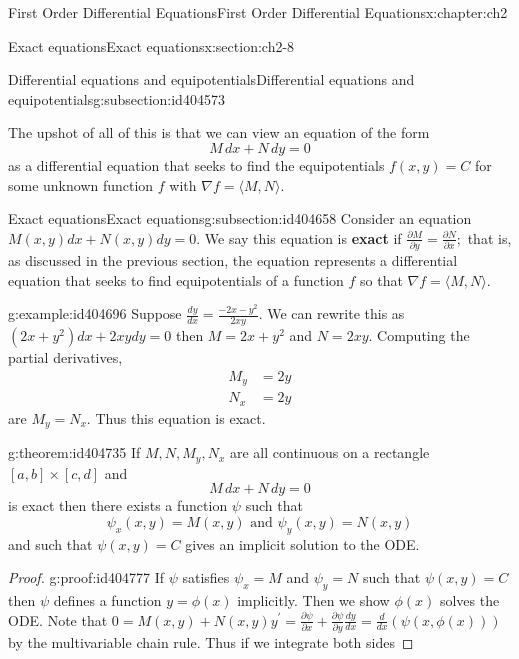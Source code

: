 \documentclass[oneside,10pt,]{book}
\newcommand{\terminology}[1]{\textbf{#1}}
\numberwithin{equation}{section}
\numberwithin{equation}{section}
\newcommand{\amp}{&}
\begin{document}
\begin{chapterptx}{First Order Differential Equations}{}{First Order Differential Equations}{}{}{x:chapter:ch2}
\begin{sectionptx}{Exact equations}{}{Exact equations}{}{}{x:section:ch2-8}
\begin{subsectionptx}{Differential equations and equipotentials}{}{Differential equations and equipotentials}{}{}{g:subsection:id404573}
%
\par
The upshot of all of this is that we can view an equation of the form%
\begin{equation*}
M \, dx + N \, dy = 0
\end{equation*}
as a differential equation that seeks to find the equipotentials \(f(x,y) = C\) for some unknown function \(f\) with \(\nabla f = \langle M, N \rangle\).%
\end{subsectionptx}
%
%
\typeout{************************************************}
\typeout{************************************************}
%
\begin{subsectionptx}{Exact equations}{}{Exact equations}{}{}{g:subsection:id404658}
Consider an equation \(M(x,y)dx+N(x,y)dy=0.\) We say this equation is \terminology{exact} if \(\frac{\partial M}{\partial y}=\frac{\partial N}{\partial x};\) that is, as discussed in the previous section, the equation represents a differential equation that seeks to find equipotentials of a function \(f\) so that \(\nabla f = \langle M, N \rangle\).%
\begin{example}{}{g:example:id404696}%
Suppose \(\frac{dy}{dx}=\frac{-2x-y^{2}}{2xy}.\) We can rewrite this as \(\left(2x+y^{2}\right)dx+2xydy=0\) then \(M=2x+y^{2}\) and \(N=2xy\). Computing the partial derivatives,%
\begin{align*}
M_{y} \amp =2y\\
N_{x} \amp =2y
\end{align*}
are \(M_{y}=N_{x}\). Thus this equation is exact.\end{example}
\begin{theorem}{}{}{g:theorem:id404735}%
If \(M,N,M_{y},N_{x}\) are all continuous on a rectangle \([a,b]\times[c,d]\) and%
\begin{equation*}
M\,dx+N\,dy=0
\end{equation*}
is exact then there exists a function \(\psi\) such that%
\begin{equation*}
\psi_{x}(x,y)=M(x,y)\text{ and }\psi_{y}(x,y)=N(x,y)
\end{equation*}
and such that \(\psi(x,y)=C\) gives an implicit solution to the ODE.%
\end{theorem}
\begin{proof}{}{g:proof:id404777}
If \(\psi\) satisfies \(\psi_{x}=M\) and \(\psi_{y}=N\) such that \(\psi(x,y)=C\) then \(\psi\) defines a function \(y=\phi(x)\) implicitly. Then we show \(\phi(x)\) solves the ODE. Note that \(0=M(x,y)+N(x,y)y^{\prime}=\frac{\partial\psi}{\partial x}+\frac{\partial\psi}{\partial y}\frac{dy}{dx}=\frac{d}{dx}\left(\psi\left(x,\phi(x)\right)\right)\) by the multivariable chain rule. Thus if we integrate both sides%

\end{proof}
\end{subsectionptx}
\end{sectionptx}
\end{chapterptx}
\end{document}
